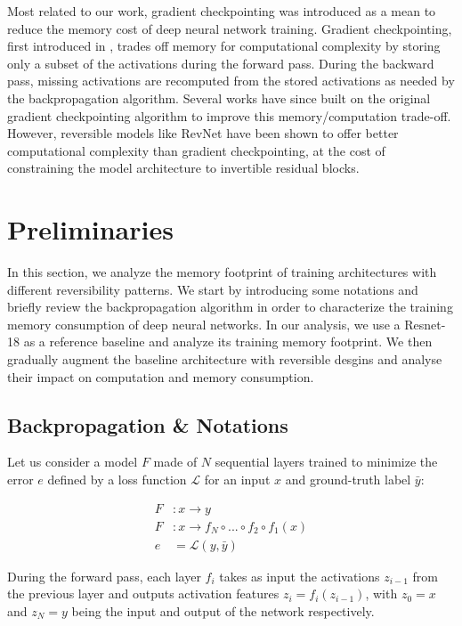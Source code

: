 \documentclass[twocolumn]{bmcart}
\begin{document}
Most related to our work, gradient checkpointing was introduced as a mean to reduce the memory cost of deep neural network training.
Gradient checkpointing, first introduced in \cite{}, trades off memory for computational complexity by storing only a subset of the activations during the forward pass.
During the backward pass, missing activations are recomputed from the stored activations as needed by the backpropagation algorithm.
Several works \cite{} have since built on the original gradient checkpointing algorithm to improve this memory/computation trade-off.  
However, reversible models like RevNet have been shown to offer better computational complexity than gradient checkpointing,
at the cost of constraining the model architecture to invertible residual blocks.

\section{Preliminaries}

In this section, we analyze the memory footprint of training architectures with different reversibility patterns.
We start by introducing some notations and briefly review the backpropagation algorithm
in order to characterize the training memory consumption of deep neural networks. 
In our analysis, we use a Resnet-18 as a reference baseline and analyze its training memory footprint.
We then gradually augment the baseline architecture with reversible desgins and analyse their impact on computation and memory consumption.

\subsection{Backpropagation \& Notations}

Let us consider a model $F$ made of $N$ sequential layers trained to minimize the error $e$ defined by a loss function $\mathcal{L}$ for an input $x$ and ground-truth label $\bar{y}$:

 \begin{subequations}
 	\begin{align}
 	F &: x \rightarrow y \\
 	F &: x \rightarrow f_N \circ ... \circ f_2 \circ f_1(x) \\
 	e &=  \mathcal{L}(y, \bar{y})
 	\end{align}
 \end{subequations}

During the forward pass, each layer $f_i$ takes as input the activations $z_{i-1}$ from the previous layer and outputs activation features $z_i=f_i(z_{i-1})$, with $z_0=x$ and $z_N=y$ being the input and output of the network respectively.
\end{document}

